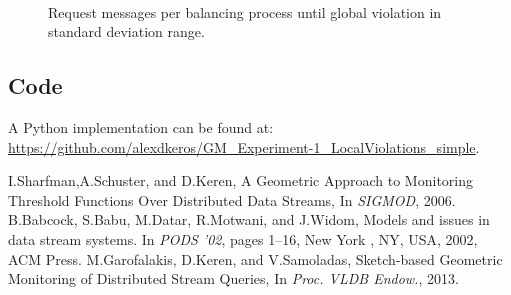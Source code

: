\documentclass{article}
\begin{document}
			\begin{figure}[H]
			\hspace*{-3.2cm}	\hfill
				\\ \hspace*{-3.2cm} \hfill
			
			\caption{Request messages per balancing process until global violation in standard deviation range.}
			\label{fig:ReqsPerBalStdRange}
			\end{figure}
			
	\subsection{Code}
	
		A Python implementation can be found at: \url{https://github.com/alexdkeros/GM_Experiment-1_LocalViolations_simple}.			
			
			
			
			
	

			
					
		
		
		
	
	
	
	\newpage
	\begin{thebibliography}{9}
		I.Sharfman,A.Schuster, and D.Keren, A Geometric Approach to Monitoring Threshold Functions Over Distributed Data Streams, In \emph{SIGMOD}, 2006.
		B.Babcock, S.Babu, M.Datar, R.Motwani, and J.Widom, Models and issues in data stream systems. In \emph{PODS '02}, pages 1--16, New York , NY, USA, 2002, ACM Press.
		 M.Garofalakis, D.Keren, and V.Samoladas, Sketch-based Geometric Monitoring of Distributed Stream Queries, In \emph{Proc. VLDB Endow.}, 2013.
	\end{thebibliography}
\end{document}
